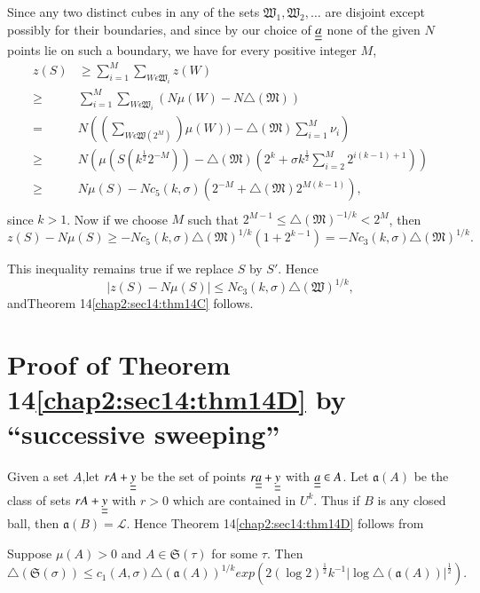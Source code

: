Since any two distinct cubes in any of the sets $\mathfrak{W}_{1}, \mathfrak{W}_{2}, \ldots$ are disjoint except possibly for their boundaries, and since by our choice of $\underline{\underline{a}}$ none of the given $N$ points lie on such a boundary, we have for every positive integer $M$,
\begin{align*}
z(S) & \geq \sum_{i=1}^{M} \sum_{W \epsilon \mathfrak{W}_{i}} z(W)\\
\geq & \sum_{i=1}^{M} \sum_{W \epsilon \mathfrak{W}_{i}} (N \mu (W) - N \triangle (\mathfrak{M}))\\
= & N\left(\left(\sum_{W \epsilon \mathfrak{W} (2^{M})}\right) \mu(W)) - \triangle (\mathfrak{M}) \sum_{i=1}^{M} \nu_{i}\right)\\
\geq & N\left(\mu \left(S\left(k^{\frac{1}{2}} 2^{-M}\right)\right) - \triangle (\mathfrak{M}) \left(2^{k} + \sigma k^{\frac{1}{2}} \sum_{i=2}^{M} 2^{i(k-1)+1}\right)\right)\\
\geq & N \mu (S) - N c_{5} (k, \sigma) (2^{-M} + \triangle (\mathfrak{M}) 2^{M(k-1)}),\\
\end{align*}
since $k > 1$. Now if we choose $M$ such that $2^{M-1} \leq \triangle (\mathfrak{M})^{-1/k} < 2^{M}$, then 
$$
z(S) - N\mu(S) \geq - Nc_{5}(k, \sigma) \triangle (\mathfrak{M})^{1/k} (1+2^{k-1}) = -N c_{3}(k, \sigma) \triangle (\mathfrak{M})^{1/k}.
$$

This inequality remains true if we replace $S$ by $S'$. Hence
$$
|z(S) - N\mu(S)| \leq N c_{3} (k, \sigma) \triangle (\mathfrak{W})^{1/k},
$$ 
and\pageoriginale Theorem 14\ref{chap2:sec14:thm14C} follows.

\section{Proof of Theorem 14\ref{chap2:sec14:thm14D} by ``successive sweeping''} \label{chap2:sec15}

Given a set $A$,let $rA + \underline{\underline{y}}$ be the set of points $r\underline{\underline{a}} + \underline{\underline{y}}$ with $\underline{\underline{a}} \in A$. Let $\mathfrak{a}(A)$ be the class of sets $rA + \underline{\underline{y}}$ with $r > 0$ which are contained in $U^{k}$. Thus if $B$ is any closed ball, then $\mathfrak{a}(B) = \mathscr{L}$. Hence Theorem 14\ref{chap2:sec14:thm14D} follows from
\begin{theorem}\label{chap2:sec15:thm15A}
Suppose $\mu(A) > 0$ and $A \in \mathfrak{S} (\tau)$ for some $\tau$. Then 
$$
\triangle(\mathfrak{S} (\sigma)) \leq c_{1} (A, \sigma) 
\triangle(\mathfrak{a}(A))^{1/k} exp (2(\log 2)^{\frac{1}{2}} k^{-1} |\log \triangle (\mathfrak{a}(A))|^{\frac{1}{2}}).
$$
\end{theorem}
 
